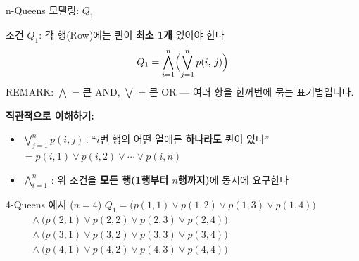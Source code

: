 \documentclass[10.5pt,compress]{beamer}
\begin{document}
\begin{frame}[t]{n-Queens 모델링: $Q_1$}
    \footnotesize

    \begin{exampleblock}{조건 $Q_1$: 각 행(Row)에는 퀸이 \textbf{최소 1개} 있어야 한다}
        \[
            Q_1 = \bigwedge_{i=1}^{n} \Bigl(\bigvee_{j=1}^{n} p(i,\, j)\Bigr)
        \]
        \scriptsize REMARK: $\bigwedge$ = 큰 AND, $\bigvee$ = 큰 OR — 여러 항을 한꺼번에 묶는 표기법입니다.
    \end{exampleblock}

    \vspace{0.06cm}
    \textbf{직관적으로 이해하기:}
    \begin{itemize}
        \setlength\itemsep{0.06em}
        \item $\bigvee_{j=1}^{n} p(i,j)$\,:
              ``$i$번 행의 어떤 열에든 \textbf{하나라도} 퀸이 있다''\\
              $= p(i,1) \lor p(i,2) \lor \cdots \lor p(i,n)$
        \item $\bigwedge_{i=1}^{n}$\,:
              위 조건을 \textbf{모든 행(1행부터 $n$행까지)}에 동시에 요구한다
    \end{itemize}

    \vspace{0.05cm}
    \begin{block}{4-Queens 예시 ($n = 4$)}
        \tiny
        $Q_1 = \bigl(p(1,1) \lor p(1,2) \lor p(1,3) \lor p(1,4)\bigr)$\\
        $\phantom{Q_1 = }\land \bigl(p(2,1) \lor p(2,2) \lor p(2,3) \lor p(2,4)\bigr)$\\
        $\phantom{Q_1 = }\land \bigl(p(3,1) \lor p(3,2) \lor p(3,3) \lor p(3,4)\bigr)$\\
        $\phantom{Q_1 = }\land \bigl(p(4,1) \lor p(4,2) \lor p(4,3) \lor p(4,4)\bigr)$
    \end{block}
\end{frame}
\end{document}
